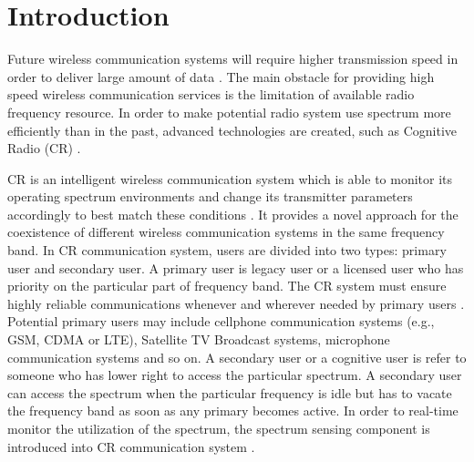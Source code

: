 \chapter{Introduction}
Future wireless communication systems will require higher transmission speed in order to deliver large amount of data \cite{pelcat20133gpp}. The main obstacle for providing high speed wireless communication services is the limitation of available radio frequency resource. In order to make potential radio system use spectrum more efficiently than in the past, advanced technologies are created, such as Cognitive Radio (CR) \cite{nonotice}. 

CR is an intelligent wireless communication system which is able to monitor its operating spectrum environments and change its transmitter parameters accordingly to best match these conditions \cite{wang2011advances, a001}. It provides a novel approach for the coexistence of different wireless communication systems in the same frequency band. In CR communication system, users are divided into two types: primary user and secondary user. A primary user is legacy user or a licensed user who has priority on the particular part of frequency band. The CR system must ensure highly reliable communications whenever and wherever needed by primary users \cite{a001}. Potential primary users may include cellphone communication systems (e.g., GSM, CDMA or LTE), Satellite TV Broadcast systems, microphone communication systems and so on. A secondary user or a cognitive user is refer to someone who has lower right to access the particular spectrum. A secondary user can access the spectrum when the particular frequency is idle but has to vacate the frequency band as soon as any primary becomes active. 
In order to real-time monitor the utilization of the spectrum, the spectrum sensing component is introduced into CR communication system \cite{buddhikot2007understanding, tandra2009spectrum}.   

